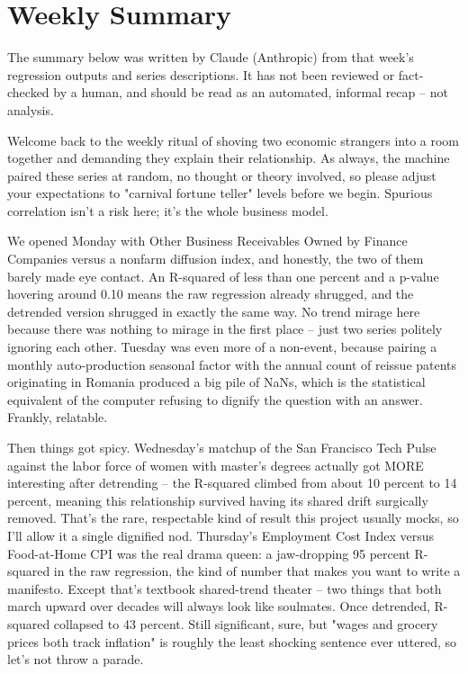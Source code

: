 \section{Weekly Summary}

\begin{tcolorbox}[colback=yellow!10,colframe=black!50,title=AI-Generated Content]
\noindent The summary below was written by Claude (Anthropic) from that week's regression outputs and series descriptions. It has not been reviewed or fact-checked by a human, and should be read as an automated, informal recap -- not analysis.
\end{tcolorbox}

Welcome back to the weekly ritual of shoving two economic strangers into a room together and demanding they explain their relationship. As always, the machine paired these series at random, no thought or theory involved, so please adjust your expectations to "carnival fortune teller" levels before we begin. Spurious correlation isn't a risk here; it's the whole business model.

We opened Monday with Other Business Receivables Owned by Finance Companies versus a nonfarm diffusion index, and honestly, the two of them barely made eye contact. An R-squared of less than one percent and a p-value hovering around 0.10 means the raw regression already shrugged, and the detrended version shrugged in exactly the same way. No trend mirage here because there was nothing to mirage in the first place -- just two series politely ignoring each other. Tuesday was even more of a non-event, because pairing a monthly auto-production seasonal factor with the annual count of reissue patents originating in Romania produced a big pile of NaNs, which is the statistical equivalent of the computer refusing to dignify the question with an answer. Frankly, relatable.

Then things got spicy. Wednesday's matchup of the San Francisco Tech Pulse against the labor force of women with master's degrees actually got MORE interesting after detrending -- the R-squared climbed from about 10 percent to 14 percent, meaning this relationship survived having its shared drift surgically removed. That's the rare, respectable kind of result this project usually mocks, so I'll allow it a single dignified nod. Thursday's Employment Cost Index versus Food-at-Home CPI was the real drama queen: a jaw-dropping 95 percent R-squared in the raw regression, the kind of number that makes you want to write a manifesto. Except that's textbook shared-trend theater -- two things that both march upward over decades will always look like soulmates. Once detrended, R-squared collapsed to 43 percent. Still significant, sure, but "wages and grocery prices both track inflation" is roughly the least shocking sentence ever uttered, so let's not throw a parade.

